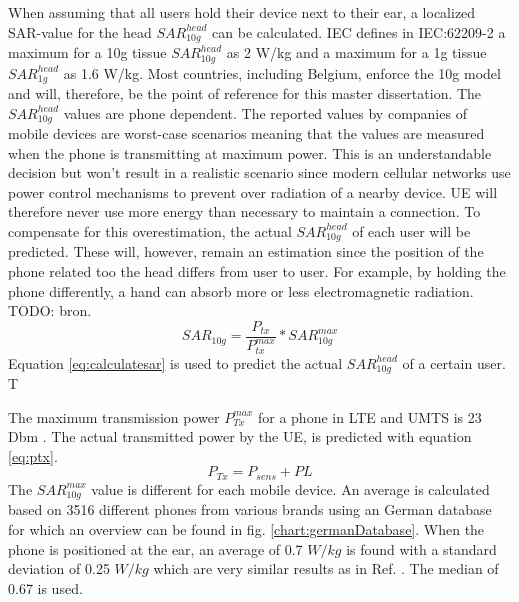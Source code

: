 When assuming that all users hold their device next to their ear, a localized SAR-value for the head $SAR^{head}_{10g}$ can be calculated.
\gls{IEC} defines in IEC:62209-2 a maximum for a 10g tissue $SAR^{head}_{10g}$ as 2 W/kg and a maximum for a 1g tissue $SAR^{head}_{1g}$ as 1.6 W/kg.
Most countries, including Belgium, enforce the 10g model and will, therefore, be the point of reference for this master dissertation.
The $SAR^{head}_{10g}$ values are phone dependent. The reported values by companies of mobile devices are worst-case scenarios meaning that the 
values are measured when the phone is transmitting at maximum power. This is an understandable decision but won't result in a realistic scenario since 
modern cellular networks use power control mechanisms to prevent over radiation of a nearby device. \gls{UE} will therefore never use more energy than 
necessary to maintain a connection.
To compensate for this overestimation, the actual $SAR^{head}_{10g}$ of each user will be predicted. These will, however, remain an estimation since the 
position of the phone related too the head differs from user to user. For example, by holding the phone differently, a hand can absorb more or less 
electromagnetic radiation. TODO: bron.
\begin{equation}
{SAR}_{10g} = \frac{P_{tx}}{P^{max}_{tx}} * {SAR}^{max}_{10g}
\label{eq:calculatesar}
\end{equation}
Equation \ref{eq:calculatesar} is used to predict the actual $SAR^{head}_{10g}$  of a certain user. T

The maximum transmission power $P^{max}_{Tx}$ for a phone in LTE and UMTS is 23 Dbm \cite{J11_maxTpxUE, J10_RDP}.
The actual transmitted power by the \gls{UE}, is predicted with equation \ref{eq:ptx}.
\begin{equation}
P_{Tx} = P_{sens} + PL
\label{eq:ptx}
\end{equation}
The $SAR^{max}_{10g}$ value is different for each mobile device. 
An average is calculated based on 3516 different phones from various brands using an German database \cite{SARDatabase} for which an overview can be 
found in fig. \ref{chart:germanDatabase}.
When the phone is positioned at the ear, an average of 0.7 $W/kg$ is found with a standard deviation of 0.25 $W/kg$ which are very similar 
results as in Ref. \cite{j10.1.1}. The median of 0.67 is used.




